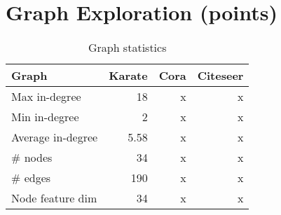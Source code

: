\section{Graph Exploration (\qtwo points)}
\label{sec:exploration}

\begin{soln}

\begin{table}[ht]
\centering
\begin{tabular}{lrrr}
\toprule
Graph            & Karate & Cora & Citeseer \\
\midrule
Max in-degree      & 18 & x & x  \\
Min in-degree      & 2 & x & x  \\
Average in-degree   & 5.58  & x & x \\
\# nodes        &  34 & x & x  \\
\# edges        &  190 & x & x  \\
Node feature dim &  34 &  x & x \\
\bottomrule
\end{tabular}
\label{tab:graphstat}
\caption{Graph statistics}
\end{table}


\end{soln}
